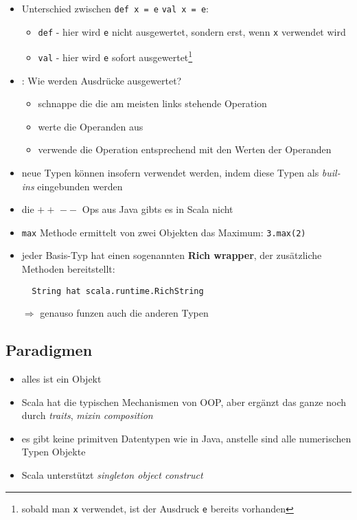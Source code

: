 \begin{itemize}
  \item Unterschied zwischen \texttt{def x = e} \und \texttt{val x = e}:
  \begin{itemize}
    \item \texttt{def} - hier wird \texttt{e} nicht ausgewertet, sondern erst,
    wenn \texttt{x} verwendet wird
    \item \texttt{val} - hier wird \texttt{e} sofort 
    ausgewertet\footnote{sobald man \texttt{x} verwendet, ist der Ausdruck 
    \texttt{e} bereits vorhanden}
  \end{itemize}
  \item {}: Wie werden Ausdrücke ausgewertet? \begin{itemize}
    \item schnappe die die am meisten links stehende Operation
    \item werte die Operanden aus
    \item verwende die Operation entsprechend mit den Werten der Operanden
  \end{itemize}
  \item neue Typen können insofern verwendet werden,
  indem diese Typen als \textit{buil-ins} eingebunden
  werden
  \item die $++$ \und $--$ Ops aus Java gibts es in Scala nicht
  \item \texttt{max} Methode ermittelt von zwei Objekten das
  Maximum: \texttt{3.max(2)}
  \item jeder Basis-Typ hat einen sogenannten \textbf{Rich wrapper}, der
  zusätzliche Methoden bereitstellt:
  
  \begin{verbatim}
  String hat scala.runtime.RichString
  \end{verbatim}
  
  $\Rightarrow$ genauso funzen auch die anderen Typen
\end{itemize}


\subsection{Paradigmen}


\begin{itemize}
  \item alles ist ein Objekt
  \item Scala hat die typischen Mechanismen von OOP, aber ergänzt das ganze
  noch durch \textit{traits}, \textit{mixin composition}
  \item es gibt keine primitven Datentypen wie in Java, anstelle sind alle 
  numerischen Typen Objekte
  \item Scala unterstützt \textit{singleton object construct}
\end{itemize}


